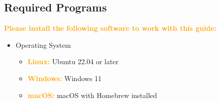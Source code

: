\documentclass[11pt,a4paper,twoside]{article}
\newcommand{\+}{\discretionary{\mbox{\scriptsize$\hookleftarrow$}}{}{}}
\begin{document}
\subsection{Required Programs}
\label{subsec:required_prog}

\textcolor{orange}{\textbf{Please install the following software to work with this guide:}}

\begin{itemize}
\item \large{{Operating System}}
  \begin{itemize}
  \item \textcolor{orange}{\textbf{Linux:}} Ubuntu 22.04 or later
  \item \textcolor{orange}{\textbf{Windows:}} Windows 11
  \item \textcolor{orange}{\textbf{macOS:}} macOS with Homebrew installed
  \end{itemize}


\end{itemize}
\end{document}
